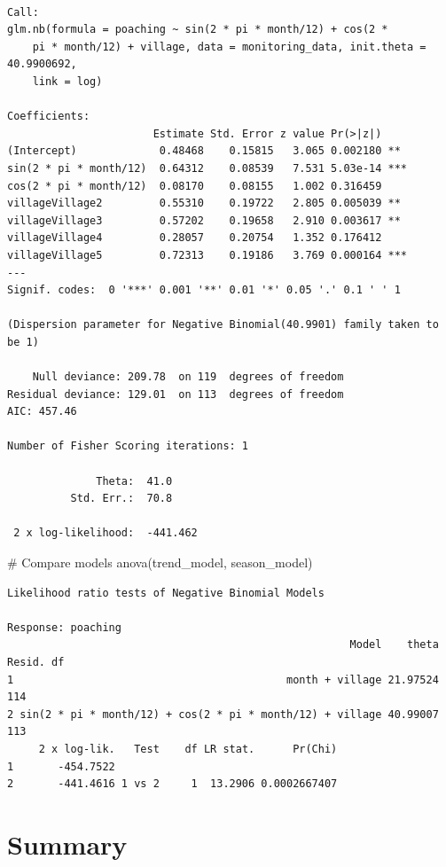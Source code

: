 \documentclass[
  letterpaper,
]{book}
\newenvironment{Shaded}{\begin{snugshade}}{\end{snugshade}}
\newcommand{\CommentTok}[1]{\textcolor[rgb]{0.37,0.37,0.37}{#1}}
\newcommand{\FunctionTok}[1]{\textcolor[rgb]{0.28,0.35,0.67}{#1}}
\newcommand{\NormalTok}[1]{\textcolor[rgb]{0.00,0.23,0.31}{#1}}
\begin{document}
\begin{verbatim}

Call:
glm.nb(formula = poaching ~ sin(2 * pi * month/12) + cos(2 * 
    pi * month/12) + village, data = monitoring_data, init.theta = 40.9900692, 
    link = log)

Coefficients:
                       Estimate Std. Error z value Pr(>|z|)    
(Intercept)             0.48468    0.15815   3.065 0.002180 ** 
sin(2 * pi * month/12)  0.64312    0.08539   7.531 5.03e-14 ***
cos(2 * pi * month/12)  0.08170    0.08155   1.002 0.316459    
villageVillage2         0.55310    0.19722   2.805 0.005039 ** 
villageVillage3         0.57202    0.19658   2.910 0.003617 ** 
villageVillage4         0.28057    0.20754   1.352 0.176412    
villageVillage5         0.72313    0.19186   3.769 0.000164 ***
---
Signif. codes:  0 '***' 0.001 '**' 0.01 '*' 0.05 '.' 0.1 ' ' 1

(Dispersion parameter for Negative Binomial(40.9901) family taken to be 1)

    Null deviance: 209.78  on 119  degrees of freedom
Residual deviance: 129.01  on 113  degrees of freedom
AIC: 457.46

Number of Fisher Scoring iterations: 1

              Theta:  41.0 
          Std. Err.:  70.8 

 2 x log-likelihood:  -441.462 
\end{verbatim}

\begin{Shaded}
\begin{Highlighting}[]
\CommentTok{\# Compare models}
\FunctionTok{anova}\NormalTok{(trend\_model, season\_model)}
\end{Highlighting}
\end{Shaded}

\begin{verbatim}
Likelihood ratio tests of Negative Binomial Models

Response: poaching
                                                      Model    theta Resid. df
1                                           month + village 21.97524       114
2 sin(2 * pi * month/12) + cos(2 * pi * month/12) + village 40.99007       113
     2 x log-lik.   Test    df LR stat.      Pr(Chi)
1       -454.7522                                   
2       -441.4616 1 vs 2     1  13.2906 0.0002667407
\end{verbatim}

\section{Summary}\label{summary-8}
\end{document}
